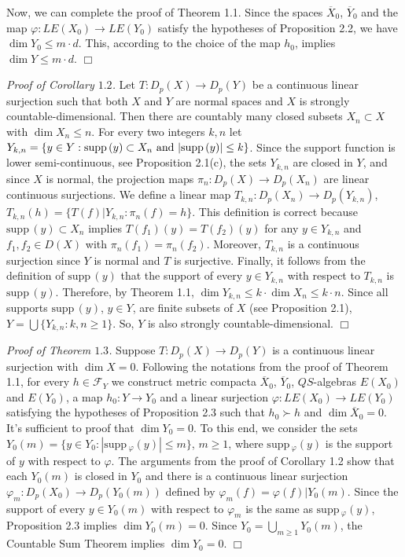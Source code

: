 \documentclass[12pt]{amsart}
\def\supp{{\mathrm {supp}}\,}
\begin{document}
Now, we can complete the proof of Theorem 1.1. Since the spaces $\overline X_0$, $\overline Y_0$ and the map $\varphi:LE(X_0)\to LE(Y_0)$ satisfy the hypotheses of Proposition 2.2, we have $\dim Y_0\leq m\cdot d$. This, according to the choice of the map $h_0$, implies $\dim Y\leq m\cdot d$.
$\Box$

\textit{ Proof of Corollary $1.2$.} Let $T:D_p(X)\to D_p(Y)$ be a continuous linear surjection such that both $X$ and $Y$ are normal spaces and $X$ is 
strongly countable-dimensional. Then there are countably many closed subsets $X_n\subset X$ with $\dim X_n\leq n$. For every two integers $k,n$ let 
$Y_{k,n}=\{y\in Y:\supp(y)\subset X_n{~}\hbox{and}{~}|\supp(y)|\leq k\}$. Since the support function is lower semi-continuous, see Proposition 2.1(c), the sets $Y_{k,n}$ are closed in $Y$, and since $X$ is normal, the projection maps $\pi_n:D_p(X)\to D_p(X_n)$ are linear continuous surjections. We define  a linear map $T_{k,n}:D_p(X_n)\to D_p(Y_{k,n})$, $T_{k,n}(h)=\{T(f)|Y_{k,n}:\pi_n(f)=h\}$. This definition is correct because $\supp(y)\subset X_n$ implies $T(f_1)(y)=T(f_2)(y)$ for any $y\in Y_{k,n}$ and $f_1,f_2\in D(X)$ with $\pi_n(f_1)=\pi_n(f_2)$. Moreover, $T_{k,n}$ is a continuous surjection since $Y$ is normal and $T$ is surjective. Finally, it follows from the definition of $\supp(y)$ that the support of every $y\in Y_{k,n}$ with respect to $T_{k,n}$ is $\supp(y)$. Therefore, by Theorem 1.1, $\dim Y_{k,n}\leq k\cdot\dim X_n\leq k\cdot n$. Since all supports $\supp(y)$, $y\in Y$, are finite subsets of $X$ (see Proposition 2.1), $Y=\bigcup\{Y_{k,n}:k,n\geq 1\}$. So, $Y$ is also strongly countable-dimensional.  $\Box$

\textit{ Proof of Theorem $1.3$.} Suppose $T:D_p(X)\to D_p(Y)$ is a continuous linear surjection with $\dim X=0$. Following the notations from the proof of Theorem 1.1, for every $h\in\mathcal F_Y$ we construct metric compacta $\overline X_0$, $\overline Y_0$, $QS$-algebras $E(X_0)$ and $E(Y_0)$, a map $h_0: Y\to Y_0$ and a linear surjection $\varphi:LE(X_0)\to LE(Y_0)$ satisfying the hypotheses of Proposition 2.3 such that $h_0\succ h$ and $\dim\overline X_0=0$. It's sufficient to proof that $\dim Y_0=0$. To this end, we consider the sets
$Y_0(m)=\{y\in Y_0:|\supp_\varphi(y)|\leq m\}$, $m\geq 1$, where $\supp_\varphi(y)$ is the support of $y$ with respect to $\varphi$. The arguments from the proof of Corollary 1.2 show that each $Y_0(m)$ is closed in $Y_0$ and there is a continuous linear surjection $\varphi_m:D_p(X_0)\to D_p(Y_0(m))$ defined by 
$\varphi_m(f)=\varphi(f)|Y_0(m)$. Since the support of every $y\in Y_0(m)$ with respect to $\varphi_m$ is the same as $\supp_\varphi(y)$,  
Proposition 2.3 implies $\dim Y_0(m)=0$. Since $Y_0=\bigcup_{m\geq 1}Y_0(m)$, the Countable Sum Theorem implies $\dim Y_0=0$. 
$\Box$
\end{document}
